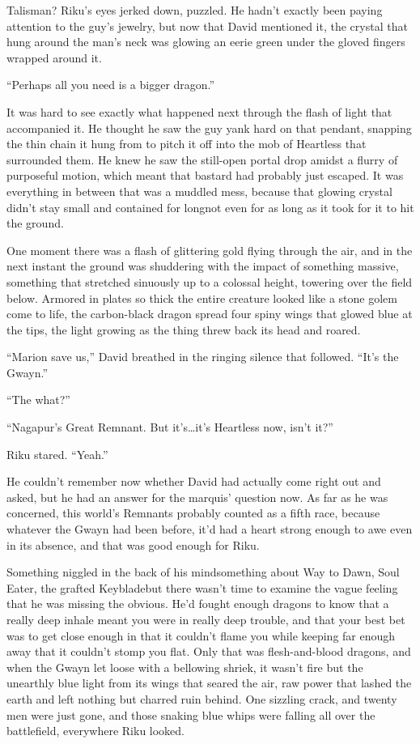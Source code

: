 Talisman? Riku's eyes jerked down, puzzled. He hadn't exactly been paying attention to the guy's jewelry, but now that David mentioned it, the crystal that hung around the man's neck was glowing an eerie green under the gloved fingers wrapped around it.

``Perhaps all you need is a bigger dragon.''

It was hard to see exactly what happened next through the flash of light that accompanied it. He thought he saw the guy yank hard on that pendant, snapping the thin chain it hung from to pitch it off into the mob of Heartless that surrounded them. He knew he saw the still-open portal drop amidst a flurry of purposeful motion, which meant that bastard had probably just escaped. It was everything in between that was a muddled mess, because that glowing crystal didn't stay small and contained for long\textemdash not even for as long as it took for it to hit the ground.

One moment there was a flash of glittering gold flying through the air, and in the next instant the ground was shuddering with the impact of something massive, something that stretched sinuously up to a colossal height, towering over the field below. Armored in plates so thick the entire creature looked like a stone golem come to life, the carbon-black dragon spread four spiny wings that glowed blue at the tips, the light growing as the thing threw back its head and roared.

``Marion save us,'' David breathed in the ringing silence that followed. ``It's the Gwayn.''

``The what?''

``Nagapur's Great Remnant. But it's\ldots it's Heartless now, isn't it?''

Riku stared. ``Yeah.''

He couldn't remember now whether David had actually come right out and asked, but he had an answer for the marquis' question now. As far as he was concerned, this world's Remnants probably counted as a fifth race, because whatever the Gwayn had been before, it'd had a heart strong enough to awe even in its absence, and that was good enough for Riku.

Something niggled in the back of his mind\textemdash something about Way to Dawn, Soul Eater, the grafted Keyblade\textemdash but there wasn't time to examine the vague feeling that he was missing the obvious. He'd fought enough dragons to know that a really deep inhale meant you were in really deep trouble, and that your best bet was to get close enough in that it couldn't flame you while keeping far enough away that it couldn't stomp you flat. Only that was flesh-and-blood dragons, and when the Gwayn let loose with a bellowing shriek, it wasn't fire but the unearthly blue light from its wings that seared the air, raw power that lashed the earth and left nothing but charred ruin behind. One sizzling crack, and twenty men were just gone, and those snaking blue whips were falling all over the battlefield, everywhere Riku looked.

